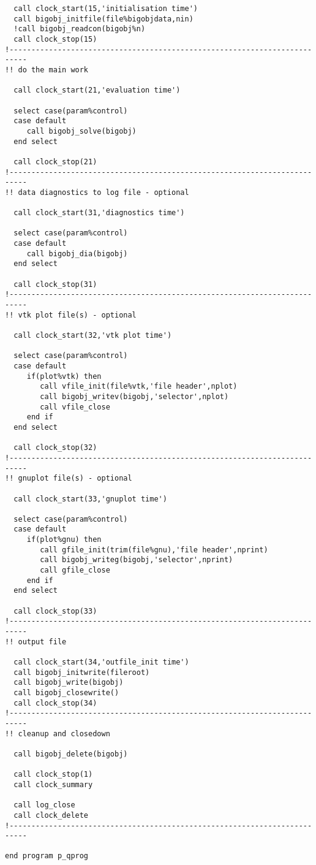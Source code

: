 \begin{verbatim}
  call clock_start(15,'initialisation time')
  call bigobj_initfile(file%bigobjdata,nin)
  !call bigobj_readcon(bigobj%n)
  call clock_stop(15)
!--------------------------------------------------------------------------
!! do the main work

  call clock_start(21,'evaluation time')

  select case(param%control)
  case default
     call bigobj_solve(bigobj)
  end select

  call clock_stop(21)
!--------------------------------------------------------------------------
!! data diagnostics to log file - optional

  call clock_start(31,'diagnostics time')

  select case(param%control)
  case default
     call bigobj_dia(bigobj)
  end select

  call clock_stop(31)
!--------------------------------------------------------------------------
!! vtk plot file(s) - optional

  call clock_start(32,'vtk plot time')

  select case(param%control)
  case default
     if(plot%vtk) then
        call vfile_init(file%vtk,'file header',nplot)
        call bigobj_writev(bigobj,'selector',nplot)
        call vfile_close
     end if
  end select

  call clock_stop(32)
!--------------------------------------------------------------------------
!! gnuplot file(s) - optional

  call clock_start(33,'gnuplot time')

  select case(param%control)
  case default
     if(plot%gnu) then
        call gfile_init(trim(file%gnu),'file header',nprint)
        call bigobj_writeg(bigobj,'selector',nprint)
        call gfile_close
     end if
  end select

  call clock_stop(33)
!--------------------------------------------------------------------------
!! output file

  call clock_start(34,'outfile_init time')
  call bigobj_initwrite(fileroot)
  call bigobj_write(bigobj)
  call bigobj_closewrite()
  call clock_stop(34)
!--------------------------------------------------------------------------
!! cleanup and closedown

  call bigobj_delete(bigobj)

  call clock_stop(1)
  call clock_summary

  call log_close
  call clock_delete
!--------------------------------------------------------------------------

end program p_qprog
\end{verbatim}
\normalsize

